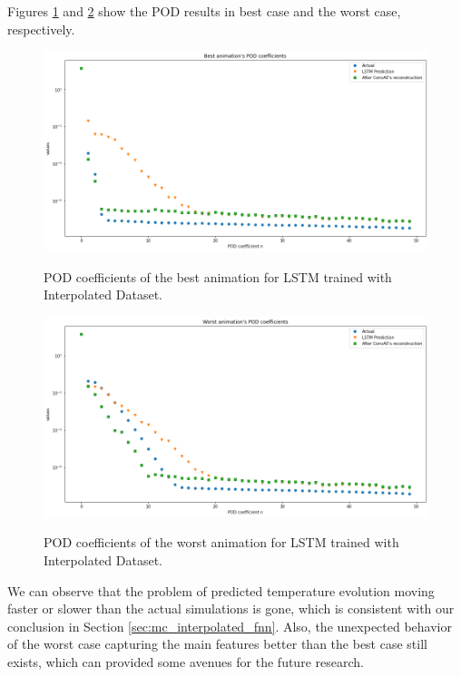Figures \ref{figure:LSTM_interpolated_best_POD} and \ref{figure:LSTM_interpolated_worst_POD} show the POD results in best case and the worst case, respectively.

\begin{figure}[H]
    \centering
    \caption{POD coefficients of the best animation for LSTM trained with Interpolated Dataset.}
    \includegraphics[scale=0.4]{figures/mantle_convection_images/larger_dataset_interpolated/LSTM_Best_POD.png}
    \label{figure:LSTM_interpolated_best_POD}
\end{figure}

\begin{figure}[H]
    \centering
    \caption{POD coefficients of the worst animation for LSTM trained with Interpolated Dataset.}
    \includegraphics[scale=0.4]{figures/mantle_convection_images/larger_dataset_interpolated/LSTM_Worst_POD.png}
    \label{figure:LSTM_interpolated_worst_POD}
\end{figure}


We can observe that the problem of predicted temperature evolution moving faster or slower than the actual simulations is gone, which is consistent with our conclusion in Section \ref{sec:mc_interpolated_fnn}. Also, the unexpected behavior of the worst case capturing the main features better than the best case still exists, which can provided some avenues for the future research.

